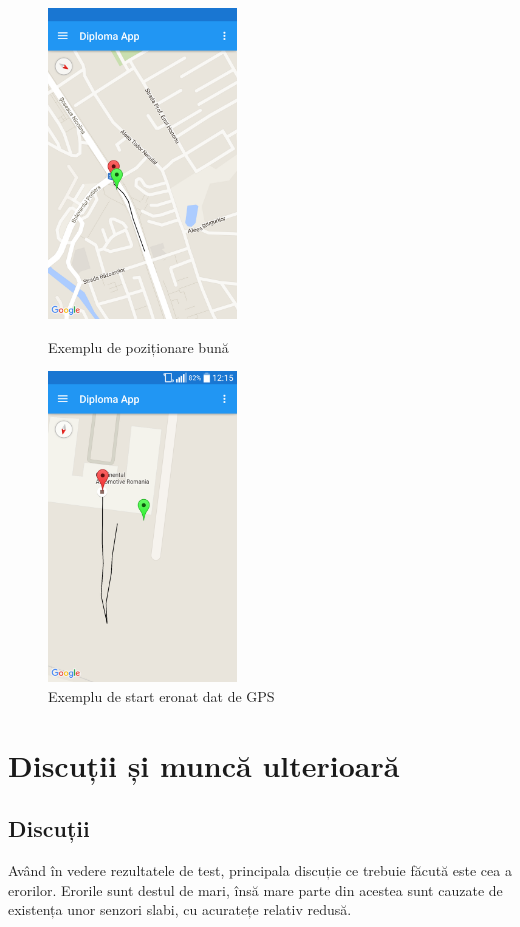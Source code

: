 \documentclass[12pt, a4paper, oneside]{article}
\begin{document}
\begin{figure}[!htb]
  \centering
  \includegraphics[width=5cm]{figures/good_path1.png}
  \caption{Exemplu de poziționare bună}
  \label{fig:good_path1}
\endminipage\hfill
{}%
  \centering
  \includegraphics[width=5cm]{figures/gps_error_start.png}
  \caption{Exemplu de start eronat dat de GPS}
  \label{fig:gps_error_start}
\endminipage
\end{figure}


\newpage
\section{Discuții și muncă ulterioară} \label{DiscutiiMuncaUlterioara}
\subsection{Discuții} \label{Discutii}
Având în vedere rezultatele de test, principala discuție ce trebuie făcută este cea a erorilor. Erorile sunt destul de mari, însă mare parte din acestea sunt cauzate de existența unor senzori slabi, cu acuratețe relativ redusă.
\end{document}
